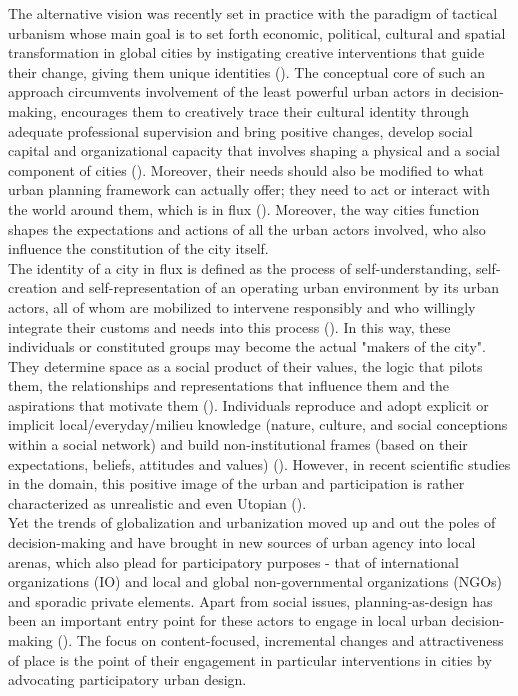 \documentclass[11pt]{report}
\begin{document}
The alternative vision was recently set in practice with the paradigm of tactical urbanism whose main goal is to set forth economic, political, cultural and spatial transformation in global cities by instigating creative interventions that guide their change, giving them unique identities
(\href{Lydon}{\citealt{lydon_tactical_2012}}).
The conceptual core of such an approach circumvents involvement of the least powerful urban actors in decision-making, encourages them to creatively trace their cultural identity through adequate professional supervision and bring positive changes, develop social capital and organizational capacity that involves shaping a physical and a social component of cities
(\href{Bolay}{\citealt{bolay_planning_1996}}).
Moreover, their needs should also be modified to what urban planning framework can actually offer; they need to act or interact with the world around them, which is in flux
(\href{Harvey}{\citealt{harvey_condition_2003}}).
Moreover, the way cities function shapes the expectations and actions of all the urban actors involved, who also influence the constitution of the city itself.
\\

The identity of a city in flux is defined as the process of self-understanding, self-creation and self-representation of an operating urban environment by its urban actors, all of whom are mobilized to intervene responsibly and who willingly integrate their customs and needs into this process
(\href{Bolay}{\citealt{bolay_urban_2005}}).
In this way, these individuals or constituted groups may become the actual "makers of the city".
They determine space as a social product of their values, the logic that pilots them, the relationships and representations that influence them and the aspirations that motivate them (\href{Lefebvre}{\citealt{Lefebvre_Production_1974}}).
Individuals reproduce and adopt explicit or implicit local/everyday/milieu knowledge (nature, culture, and social conceptions within a social network) and build non-institutional frames (based on their expectations, beliefs, attitudes and values) (\href{Getimis}{\citealt{Getimis 2012}}).
However, in recent scientific studies in the domain, this  positive image of the urban and participation is rather characterized as unrealistic and even Utopian
(\href{Lindner}{\citealt{lindner_XXXX_2009}}).
\\

Yet the trends of globalization and urbanization moved up and out the poles of decision-making and have brought in new sources of urban agency into local arenas, which also plead for participatory purposes - that of international organizations (IO) and local and global non-governmental organizations (NGOs) and sporadic private elements.
Apart from social issues, planning-as-design has been an important entry point for these actors to engage in local urban decision-making
(\href{Van}{\citealt{van_assche_co-evolutions_2013}}).
The focus on content-focused, incremental changes  and attractiveness of place is the point of their engagement in particular interventions in cities by advocating participatory urban design.
\\
\end{document}
